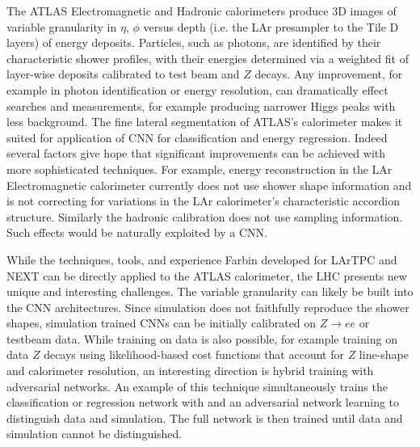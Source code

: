 


The ATLAS Electromagnetic and Hadronic calorimeters produce 3D images
of variable granularity in $\eta$, $\phi$ versus depth (i.e. the LAr
presampler to the Tile D layers) of energy deposits. Particles, such
as photons, are identified by their characteristic shower profiles,
with their energies determined via a weighted fit of layer-wise
deposits calibrated to test beam and $Z$ decays. Any improvement, for
example in photon identification or energy resolution, can
dramatically effect searches and measurements, for example producing
narrower Higgs peaks with less background. The fine lateral
segmentation of ATLAS's calorimeter makes it suited for application of
CNN for classification and energy regression. Indeed several factors
give hope that significant improvements can be achieved with more
sophisticated techniques. For example, energy reconstruction in the
LAr Electromagnetic calorimeter currently does not use shower shape
information and is not correcting for variations in the LAr
calorimeter's characteristic accordion structure. Similarly the
hadronic calibration does not use sampling information. Such effects
would be naturally exploited by a CNN.

While the techniques, tools, and experience Farbin developed for
LArTPC and NEXT can be directly applied to the ATLAS calorimeter, the
LHC presents new unique and interesting challenges. The variable
granularity can likely be built into the CNN architectures. Since
simulation does not faithfully reproduce the shower shapes, simulation
trained CNNs can be initially calibrated on $Z\rightarrow e e$ or
testbeam data. While training on data is also possible, for example
training on data $Z$ decays using likelihood-based cost functions that
account for $Z$ line-shape and calorimeter resolution, an interesting
direction is hybrid training with adversarial networks. An example of
this technique simultaneously trains the classification or regression
network with and an adversarial network learning to distinguish data
and simulation. The full network is then trained until data and
simulation cannot be distinguished.

